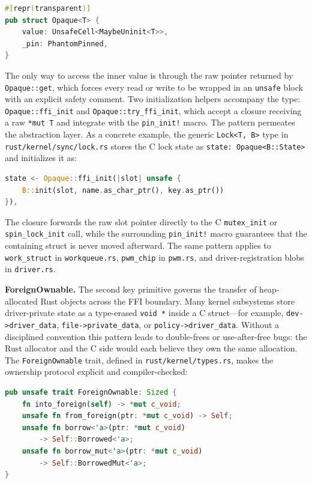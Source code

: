 \begin{lstlisting}[language=Rust,columns=fullflexible]
#[repr(transparent)]
pub struct Opaque<T> {
    value: UnsafeCell<MaybeUninit<T>>,
    _pin: PhantomPinned,
}
\end{lstlisting}

\noindent
The only way to access the inner value is through the raw pointer returned by \texttt{Opaque::get},
which forces every read or write to be wrapped in an \texttt{unsafe} block with an explicit safety
comment.
Two initialization helpers accompany the type: \texttt{Opaque::ffi\_init} and
\texttt{Opaque::try\_ffi\_init}, which accept a closure receiving a raw \texttt{*mut T} and
integrate with the \texttt{pin\_init!} macro.
The pattern permeates the abstraction layer.
As a concrete example, the generic \texttt{Lock<T,~B>} type in \texttt{rust/kernel/sync/lock.rs}
stores the C lock state as \texttt{state:~Opaque<B::State>} and initializes it as:

\begin{lstlisting}[language=Rust,columns=fullflexible]
state <- Opaque::ffi_init(|slot| unsafe {
    B::init(slot, name.as_char_ptr(), key.as_ptr())
}),
\end{lstlisting}

\noindent
The closure forwards the raw slot pointer directly to the C \texttt{mutex\_init} or
\texttt{spin\_lock\_init} call, while the surrounding \texttt{pin\_init!} macro guarantees that
the containing struct is never moved afterward.
The same pattern applies to \texttt{work\_struct} in \texttt{workqueue.rs}, \texttt{pwm\_chip} in
\texttt{pwm.rs}, and driver-registration blobs in \texttt{driver.rs}.

\textbf{ForeignOwnable.}
The second key primitive governs the transfer of heap-allocated Rust objects across the FFI
boundary.
Many kernel subsystems store driver-private state as a type-erased \texttt{void~*} inside a
C struct---for example, \texttt{dev->driver\_data}, \texttt{file->private\_data}, or
\texttt{policy->driver\_data}.
Without a disciplined convention this pattern leads to double-frees or use-after-free bugs: the
Rust allocator and the C side would each believe they own the same allocation.
The \texttt{ForeignOwnable} trait, defined in \texttt{rust/kernel/types.rs}, makes the ownership
protocol explicit and compiler-checked:

\begin{lstlisting}[language=Rust,columns=fullflexible]
pub unsafe trait ForeignOwnable: Sized {
    fn into_foreign(self) -> *mut c_void;
    unsafe fn from_foreign(ptr: *mut c_void) -> Self;
    unsafe fn borrow<'a>(ptr: *mut c_void)
        -> Self::Borrowed<'a>;
    unsafe fn borrow_mut<'a>(ptr: *mut c_void)
        -> Self::BorrowedMut<'a>;
}
\end{lstlisting}


